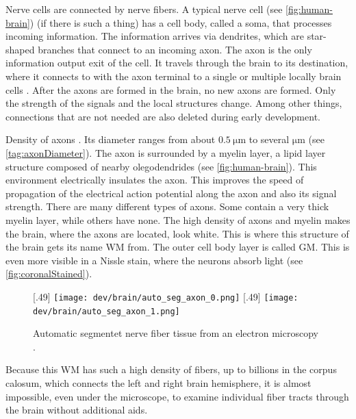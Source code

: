 % 
Nerve cells are connected by nerve fibers.
A typical nerve cell (see \cref{fig:human-brain}) (if there is such a thing) has a cell body, called a soma, that processes incoming information.
The information arrives via dendrites, which are star-shaped branches that connect to an incoming axon.
The axon is the only information output exit of the cell.
It travels through the brain to its destination, where it connects to with the axon terminal to a single or multiple locally brain cells .
After the axons are formed in the brain, no new axons are formed.
Only the strength of the signals and the local structures change.
Among other things, connections that are not needed are also deleted during early development.
\par
% 
Density of axons \dummy{}.
Its diameter ranges from about $\SI{0.5}{\micro\meter}$ to several $\si{\micro\meter}$ (see \cref{tag:axonDiameter}).
The axon is surrounded by a myelin layer, a lipid layer structure composed of nearby olegodendrides (see \cref{fig:human-brain}).
This environment electrically insulates the axon.
This improves the speed of propagation of the electrical action potential along the axon and also its signal strength.
There are many different types of axons.
Some contain a very thick myelin layer, while others have none.
The high density of axons and myelin makes the brain, where the axons are located, look white.
This is where this structure of the brain gets its name \ac{WM} from.
The outer cell body layer is called \ac{GM}.
This is even more visible in a Nissle stain, where the neurons absorb light (see \cref{fig:coronalStained}).
\par
% 
% 
% 
\begin{figure}[!t]
	\centering
	\subcaptionbox{}[.49\textwidth]{
	    \texttt{[image: dev/brain/auto\_seg\_axon\_0.png]}}\hfill
    \subcaptionbox{}[.49\textwidth]{
        \texttt{[image: dev/brain/auto\_seg\_axon\_1.png]}}
	\caption{Automatic segmentet nerve fiber tissue from an electron microscopy \cite{Abdollahzadeh2019}. }
	\label{fig:elecMic}
\end{figure}
% 
Because this \ac{WM} has such a high density of fibers, up to billions in the corpus calosum, which connects the left and right brain hemisphere, it is almost impossible, even under the microscope, to examine individual fiber tracts through the brain without additional aids.
